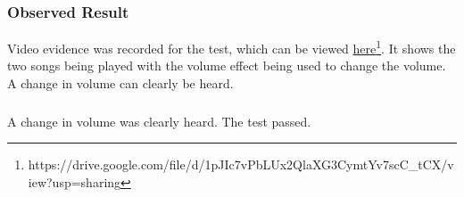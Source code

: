 \subsubsection{Observed Result}
\label{sec:evidence4.3}
Video evidence was recorded for the test, which can be viewed \href{https://drive.google.com/file/d/1pJIc7vPbLUx2QlaXG3CymtYv7scC_tCX/view?usp=sharing}{here}\footnote{
	https://drive.google.com/file/d/1pJIc7vPbLUx2QlaXG3CymtYv7scC\_tCX/view?usp=sharing
}. It shows the two songs being played with the volume effect being used to change the volume. A change in volume can clearly be heard.

\subsubsection{}
A change in volume was clearly heard. The test passed.